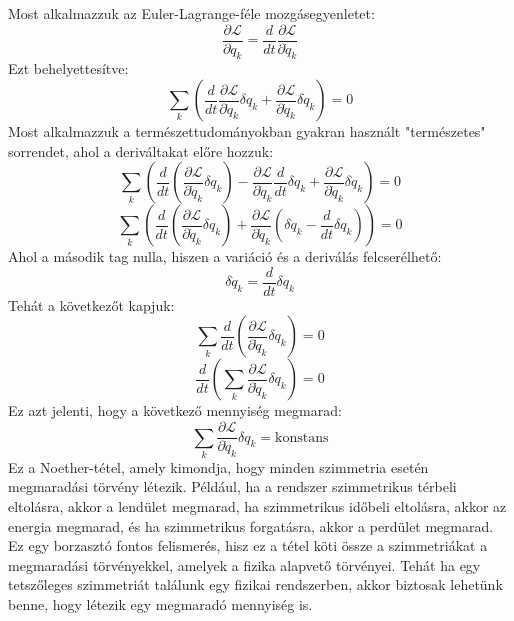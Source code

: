 \documentclass[a4paper,12pt]{article}
\begin{document}
Most alkalmazzuk az Euler-Lagrange-féle mozgásegyenletet:
\begin{equation}
    \frac{\partial \mathcal{L}}{\partial q_k} = \frac{d}{dt} \frac{\partial \mathcal{L}}{\partial \dot{q}_k}
\end{equation}
Ezt behelyettesítve:
\begin{equation}
    \sum_k \left( \frac{d}{dt} \frac{\partial \mathcal{L}}{\partial \dot{q}_k} \delta q_k + \frac{\partial \mathcal{L}}{\partial \dot{q}_k} \delta \dot{q}_k \right) = 0
\end{equation}
Most alkalmazzuk a természettudományokban gyakran használt "természetes" sorrendet, ahol a deriváltakat előre hozzuk:
\begin{equation}
    \sum_k \left( \frac{d}{dt} \left( \frac{\partial \mathcal{L}}{\partial \dot{q}_k} \delta q_k \right) - \frac{\partial \mathcal{L}}{\partial \dot{q}_k} \frac{d}{dt} \delta q_k + \frac{\partial \mathcal{L}}{\partial \dot{q}_k} \delta \dot{q}_k \right) = 0
\end{equation}
\begin{equation}
    \sum_k \left( \frac{d}{dt} \left( \frac{\partial \mathcal{L}}{\partial \dot{q}_k} \delta q_k \right) + \frac{\partial \mathcal{L}}{\partial \dot{q}_k} (\delta \dot{q}_k - \frac{d}{dt} \delta q_k) \right) = 0
\end{equation}
Ahol a második tag nulla, hiszen a variáció és a deriválás felcserélhető:
\begin{equation}
    \delta \dot{q}_k = \frac{d}{dt} \delta q_k
\end{equation}
Tehát a következőt kapjuk:
\begin{equation}
    \sum_k \frac{d}{dt} \left( \frac{\partial \mathcal{L}}{\partial \dot{q}_k} \delta q_k \right) = 0
\end{equation}
\begin{equation}
    \frac{d}{dt} \left( \sum_k \frac{\partial \mathcal{L}}{\partial \dot{q}_k} \delta q_k \right) = 0
\end{equation}
Ez azt jelenti, hogy a következő mennyiség megmarad:
\begin{equation}
    \sum_k \frac{\partial \mathcal{L}}{\partial \dot{q}_k} \delta q_k = \text{konstans}
\end{equation}
Ez a Noether-tétel, amely kimondja, hogy minden szimmetria esetén megmaradási törvény létezik. Például, ha a rendszer szimmetrikus térbeli eltolásra, akkor a lendület megmarad, ha szimmetrikus időbeli eltolásra, akkor az energia megmarad,
és ha szimmetrikus forgatásra, akkor a perdület megmarad. Ez egy borzasztó fontos felismerés, hisz ez a tétel köti össze a szimmetriákat a megmaradási törvényekkel, amelyek a fizika alapvető törvényei. Tehát ha egy tetszőleges szimmetriát találunk egy fizikai rendszerben,
akkor biztosak lehetünk benne, hogy létezik egy megmaradó mennyiség is.
\end{document}

